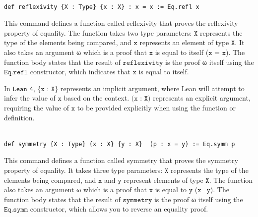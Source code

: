 \documentclass{book}
\theoremstyle{definition}
\newcounter{lcounter}
\begin{document}
\begin{center}
\begin{tcolorbox}[width=5in,colback={white},title={\begin{center}\texttt{Lean \thelcounter} \addtocounter{lcounter}{1}  \end{center}},colbacktitle=Blue,coltitle=black]
\begin{verbatim}

def reflexivity {X : Type} {x : X} : x = x := Eq.refl x

\end{verbatim}
\end{tcolorbox}
\end{center}

This command defines a function called reflexivity that proves the reflexivity property of equality. The function takes two type parameters: $\texttt{X}$ represents the type of the elements being compared, and $\texttt{x}$ represents an element of type $\texttt{X}$. It also takes an argument ω which is a proof that $\texttt{x}$ is equal to itself ($\texttt{x = x}$). The function body states that the result of $\texttt{reflexivity}$ is the proof ω itself using the $\texttt{Eq.refl}$ constructor, which indicates that $\texttt{x}$  is equal to itself.

In $\texttt{Lean 4}$, $\{\texttt{x : X}\}$ represents an implicit argument, where Lean will attempt to infer the value of $\texttt{x}$ based on the context. $\texttt{(x : X)}$ represents an explicit argument, requiring the value of $\texttt{x}$ to be provided explicitly when using the function or definition.

\begin{center}
\begin{tcolorbox}[width=5in,colback={white},title={\begin{center}\texttt{Lean \thelcounter} \addtocounter{lcounter}{1}  \end{center}},colbacktitle=Blue,coltitle=black]
\begin{verbatim}

def symmetry {X : Type} {x : X} {y : X}  (p : x = y) := Eq.symm p

\end{verbatim}
\end{tcolorbox}
\end{center}

This command defines a function called symmetry that proves the symmetry property of equality. It takes three type parameters: $\texttt{X}$ represents the type of the elements being compared, and $\texttt{x}$ and $\texttt{y}$ represent elements of type $\texttt{X}$. The function also takes an argument ω which is a proof that $\texttt{x}$ is equal to $\texttt{y}$ ($\texttt{x=y}$). The function body states that the result of $\texttt{symmetry}$ is the proof ω itself using the $\texttt{Eq.symm}$ constructor, which allows you to reverse an equality proof.
\end{document}
